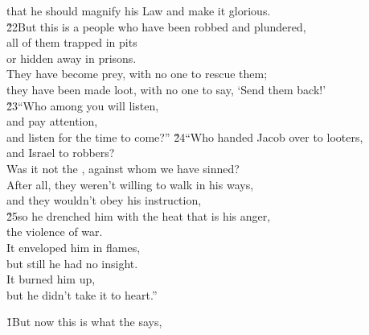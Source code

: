 \begin{poetry}
\poemll    that he should magnify his Law and make it glorious. \\
\poeml \v{22}But this is a people who have been robbed and plundered, \\
\poemll    all of them trapped in pits \\
\poemlll       or hidden away in prisons. \\
\poeml They have become prey, with no one to rescue them; \\
\poemll    they have been made loot, with no one to say, `Send them back!' \\
\poeml \v{23}``Who among you will listen, \\
\poemll    and pay attention, \\
\poemlll       and listen for the time to come?''
\poeml \v{24}``Who handed Jacob over to looters, \\
\poemll    and Israel to robbers? \\
\poeml Was it not the , against whom we have sinned? \\
\poemll    After all, they weren't willing to walk in his ways, \\
\poemlll       and they wouldn't obey his instruction, \\
\poeml \v{25}so he drenched him with the heat that is his anger, \\
\poemll    the violence of war. \\
\poeml It enveloped him in flames, \\
\poemll    but still he had no insight. \\
\poeml It burned him up, \\
\poemll    but he didn't take it to heart.''
\end{poetry}

\v{1}But now this is what the  says,

